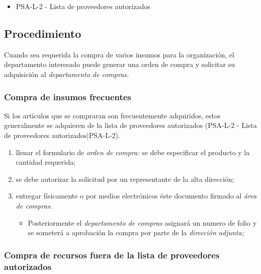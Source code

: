 \begin{itemize}
	\item PSA-L-2 - Lista de proveedores autorizados
\end{itemize}

\subsection{Procedimiento}

Cuando sea requerida la compra de varios insumos para la organización, el departamento interesado puede generar una orden de compra y solicitar su adquisición al \emph{departamento de compras.}

\subsubsection{Compra de insumos frecuentes}

Si los artículos que se compraran son frecuentemente adquiridos, estos generalmente se adquieren de la lista de proveedores autorizados (PSA-L-2 - Lista de proveedores autorizados|PSA-L-2).

\begin{enumerate}
	\item llenar el formulario de \emph{orden de compra:} se debe especificar el producto y la cantidad requerida;
	\item se debe autorizar la solicitud por un representante de la alta dirección;
	\item entregar físicamente o por medios electrónicos éste documento firmado al \emph{área de compras.}
	\begin{itemize}
		\item Posteriormente el \emph{departamento de compras} asignará un numero de folio y se someterá a aprobación la compra por parte de la \emph{dirección adjunta;}
	\end{itemize}
\end{enumerate}

\subsubsection{Compra de recursos fuera de la lista de proveedores autorizados}

